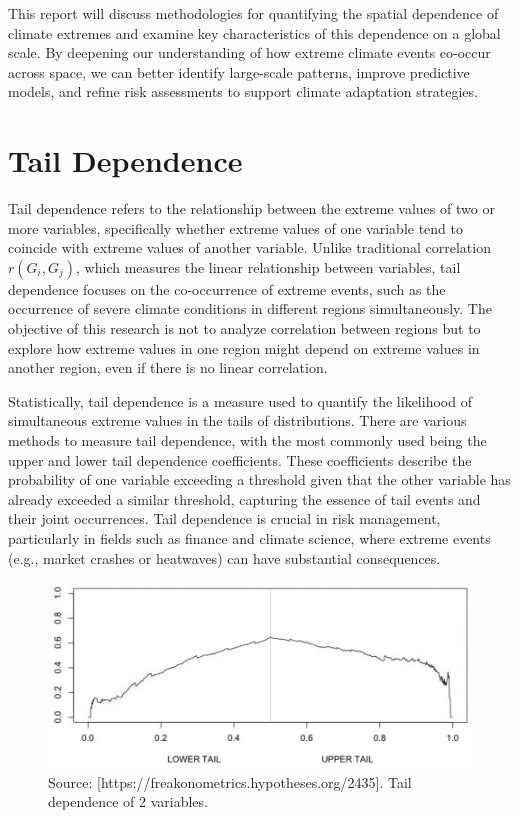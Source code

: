 \documentclass[
]{krantz}
\begin{document}
This report will discuss methodologies for quantifying the spatial dependence of climate extremes and examine key characteristics of this dependence on a global scale. By deepening our understanding of how extreme climate events co-occur across space, we can better identify large-scale patterns, improve predictive models, and refine risk assessments to support climate adaptation strategies.

\section{Tail Dependence}\label{tail-dependence}

Tail dependence refers to the relationship between the extreme values of two or more variables, specifically whether extreme values of one variable tend to coincide with extreme values of another variable. Unlike traditional correlation \(r(G_i, G_j)\), which measures the linear relationship between variables, tail dependence focuses on the co-occurrence of extreme events, such as the occurrence of severe climate conditions in different regions simultaneously. The objective of this research is not to analyze correlation between regions but to explore how extreme values in one region might depend on extreme values in another region, even if there is no linear correlation.

Statistically, tail dependence is a measure used to quantify the likelihood of simultaneous extreme values in the tails of distributions. There are various methods to measure tail dependence, with the most commonly used being the upper and lower tail dependence coefficients. These coefficients describe the probability of one variable exceeding a threshold given that the other variable has already exceeded a similar threshold, capturing the essence of tail events and their joint occurrences. Tail dependence is crucial in risk management, particularly in fields such as finance and climate science, where extreme events (e.g., market crashes or heatwaves) can have substantial consequences.

\vspace{1em}
\begin{figure}

{\centering \includegraphics[width=0.8\linewidth]{work/06-anthropo/figures/tail} 

}

\caption{Source: [https://freakonometrics.hypotheses.org/2435]. Tail dependence of 2 variables.}\label{fig:unnamed-chunk-6}
\end{figure}
\vspace{1em}
\end{document}
